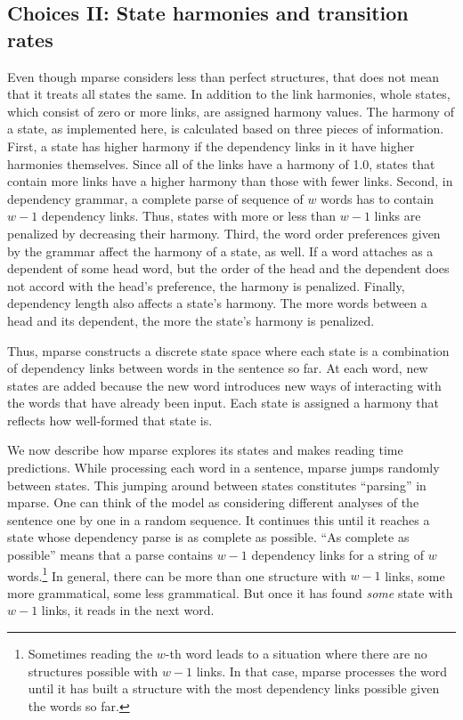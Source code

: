 \documentclass[a4paper, 12pt]{article}
\begin{document}
\subsection{Choices II: State harmonies and transition rates}
Even though mparse considers less than perfect structures, that does not mean
that it treats all states the same. In addition to the link harmonies, whole
states, which consist of zero or more links, are assigned harmony values. The
harmony of a state, as implemented here, is calculated based on three pieces of
information. First, a state has higher harmony if the dependency links in it
have higher harmonies themselves. Since all of the links have a harmony of 1.0,
states that contain more links have a higher harmony than those with fewer
links. Second, in dependency grammar, a complete parse of sequence of $w$ words
has to contain $w - 1$ dependency links. Thus, states with more or less than $w
- 1$ links are penalized by decreasing their harmony. Third, the word order
preferences given by the grammar affect the harmony of a state, as well. If a
word attaches as a dependent of some head word, but the order of the head and
the dependent does not accord with the head's preference, the harmony is
penalized. Finally, dependency length also affects a state's harmony. The more
words between a head and its dependent, the more the state's harmony is
penalized. 

Thus, mparse constructs a discrete state space where each state is a
combination of dependency links between words in the sentence so far. At each
word, new states are added because the new word introduces new ways of
interacting with the words that have already been input. Each state is assigned
a harmony that reflects how well-formed that state is.

We now describe how mparse explores its states and makes reading time
predictions. While processing each word in a sentence, mparse jumps randomly
between states. This jumping around between states constitutes
``parsing'' in mparse. One can think of the model as considering different
analyses of the sentence one by one in a random sequence. It continues this
until it reaches a state whose dependency parse is as complete as possible.
``As complete as possible'' means that a parse contains $w - 1$ dependency
links for a string of $w$ words.\footnote{Sometimes reading the $w$-th word
    leads to a situation where there are no structures possible with $w - 1$
    links. In that case, mparse processes the word until it has built a
    structure with the most dependency links possible given the words so far.}
In general, there can be more than one structure with $w - 1$ links, some more
grammatical, some less grammatical.  But once it has found \emph{some}
state with $w - 1$ links, it reads in the next word.
\end{document}
